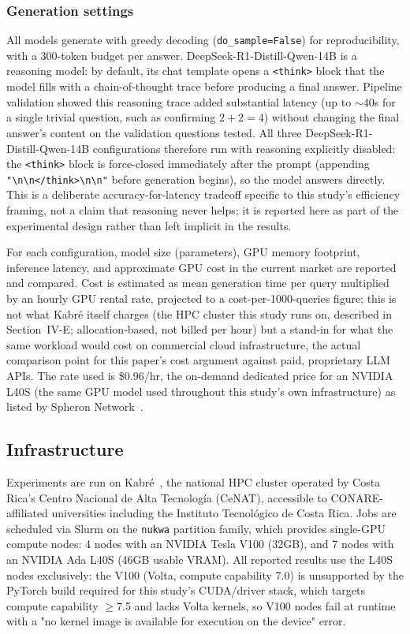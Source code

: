 \documentclass[conference]{IEEEtran}
\begin{document}
\subsubsection{Generation settings}

All models generate with greedy decoding (\texttt{do\_sample=False}) for reproducibility, with a 300-token budget per answer.
DeepSeek-R1-Distill-Qwen-14B is a reasoning model: by default, its chat template opens a \texttt{<think>} block that the model fills with a chain-of-thought trace before producing a final answer.
Pipeline validation showed this reasoning trace added substantial latency (up to $\sim$40s for a single trivial question, such as confirming $2+2=4$) without changing the final answer's content on the validation questions tested.
All three DeepSeek-R1-Distill-Qwen-14B configurations therefore run with reasoning explicitly disabled: the \texttt{<think>} block is force-closed immediately after the prompt (appending \texttt{"\textbackslash n\textbackslash n</think>\textbackslash n\textbackslash n"} before generation begins), so the model answers directly.
This is a deliberate accuracy-for-latency tradeoff specific to this study's efficiency framing, not a claim that reasoning never helps; it is reported here as part of the experimental design rather than left implicit in the results.

For each configuration, model size (parameters), GPU memory footprint, inference latency, and approximate GPU cost in the current market are reported and compared.
Cost is estimated as mean generation time per query multiplied by an hourly GPU rental rate, projected to a cost-per-1000-queries figure; this is not what Kabr\'e itself charges (the \gls{HPC} cluster this study runs on, described in Section~IV-E; allocation-based, not billed per hour) but a stand-in for what the same workload would cost on commercial cloud infrastructure, the actual comparison point for this paper's cost argument against paid, proprietary LLM APIs.
The rate used is \$0.96/hr, the on-demand dedicated price for an NVIDIA L40S (the same GPU model used throughout this study's own infrastructure) as listed by Spheron Network~\cite{spheron2026l40s}.

\subsection{Infrastructure}

Experiments are run on Kabr\'e~\cite{cenat2026kabre}, the national HPC cluster operated by Costa Rica's Centro Nacional de Alta Tecnolog\'ia (CeNAT), accessible to CONARE-affiliated universities including the Instituto Tecnol\'ogico de Costa Rica.
Jobs are scheduled via Slurm on the \texttt{nukwa} partition family, which provides single-GPU compute nodes: 4 nodes with an NVIDIA Tesla V100 (32GB), and 7 nodes with an NVIDIA Ada L40S (46GB usable VRAM).
All reported results use the L40S nodes exclusively: the V100 (Volta, compute capability 7.0) is unsupported by the PyTorch build required for this study's CUDA/driver stack, which targets compute capability $\geq$7.5 and lacks Volta kernels, so V100 nodes fail at runtime with a "no kernel image is available for execution on the device" error.
\end{document}
